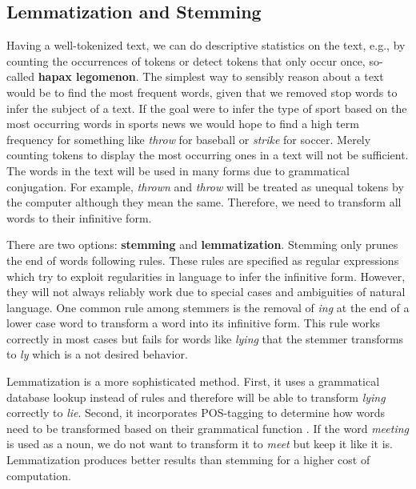 \subsection{Lemmatization and Stemming}\label{stemming}
  Having a well-tokenized text, we can do descriptive statistics on the text, e.g., by counting the occurrences of tokens or detect tokens that only occur once, so-called \textbf{hapax legomenon}.
  The simplest way to sensibly reason about a text would be to find the most frequent words, given that we removed stop words to infer the subject of a text.
  If the goal were to infer the type of sport based on the most occurring words in sports news we would hope to find a high term frequency for something like \textit{throw} for baseball or \textit{strike} for soccer.
  Merely counting tokens to display the most occurring ones in a text will not be sufficient.
  The words in the text will be used in many forms due to grammatical conjugation.
  For example, \textit{thrown} and \textit{throw} will be treated as unequal tokens by the computer although they mean the same.
  Therefore, we need to transform all words to their infinitive form.

  There are two options: \textbf{stemming} and \textbf{lemmatization}.
  Stemming only prunes the end of words following rules.
  These rules are specified as regular expressions which try to exploit regularities in language to infer the infinitive form.
  However, they will not always reliably work due to special cases and ambiguities of natural language.
  One common rule among stemmers is the removal of \textit{ing} at the end of a lower case word to transform a word into its infinitive form.
  This rule works correctly in most cases but fails for words like \textit{lying} that the stemmer transforms to \textit{ly} which is a not desired behavior.

  Lemmatization is a more sophisticated method.
  First, it uses a grammatical database lookup instead of rules and therefore will be able to transform \textit{lying} correctly to \textit{lie}.
  Second, it incorporates POS-tagging to determine how words need to be transformed based on their grammatical function \citep{Muller2015}.
  If the word \textit{meeting} is used as a noun, we do not want to transform it to \textit{meet} but keep it like it is.
  Lemmatization produces better results than stemming \citep{Balakrishnan2014} for a higher cost of computation.


